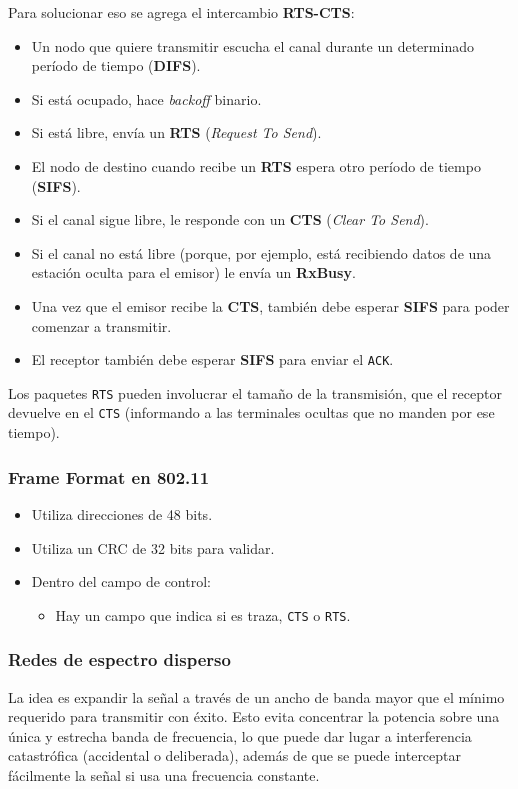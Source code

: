 \documentclass[]{article}
\begin{document}
Para solucionar eso se agrega el intercambio \textbf{RTS-CTS}:
\begin{itemize}
    \item Un nodo que quiere transmitir escucha el canal durante un determinado período de tiempo (\textbf{DIFS}).
    \item Si está ocupado, hace \emph{backoff} binario.
    \item Si está libre, envía un \textbf{RTS} (\emph{Request To Send}).
    \item El nodo de destino cuando recibe un \textbf{RTS} espera otro período de tiempo (\textbf{SIFS}).
    \item Si el canal sigue libre, le responde con un \textbf{CTS} (\emph{Clear To Send}).
    \item Si el canal no está libre (porque, por ejemplo, está recibiendo datos de una estación oculta para el emisor) le envía un \textbf{RxBusy}.
    \item Una vez que el emisor recibe la \textbf{CTS}, también debe esperar \textbf{SIFS} para poder comenzar a transmitir.
    \item El receptor también debe esperar \textbf{SIFS} para enviar el \texttt{ACK}.
\end{itemize}

Los paquetes \texttt{RTS} pueden involucrar el tamaño de la transmisión, que el receptor devuelve en el \texttt{CTS} (informando a las terminales ocultas que no manden por ese tiempo).

\subsubsection{Frame Format en 802.11}

\begin{itemize}
    \item Utiliza direcciones de 48 bits.
    \item Utiliza un CRC de 32 bits para validar.
    \item Dentro del campo de control:
    \begin{itemize}
        \item Hay un campo que indica si es traza, \texttt{CTS} o \texttt{RTS}.
    \end{itemize}
\end{itemize}

\subsubsection{Redes de espectro disperso}
La idea es expandir la señal a través de un ancho de banda mayor que el mínimo requerido para transmitir con éxito. Esto evita concentrar la potencia sobre una única y estrecha banda de frecuencia, lo que puede dar lugar a interferencia catastrófica (accidental o deliberada), además de que se puede interceptar fácilmente la señal si usa una frecuencia constante.
\end{document}

